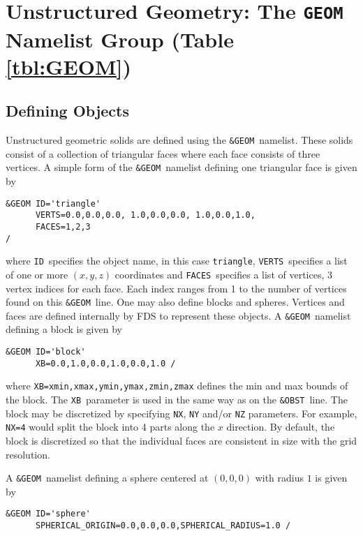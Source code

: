 \documentclass[12pt]{article}
\begin{document}
\vspace{1.0in}
\section{Unstructured Geometry: The \texorpdfstring{{\tt GEOM}}{GEOM} Namelist Group (Table \ref{tbl:GEOM})}
\label{info:GEOM}
\subsection{Defining Objects}

Unstructured geometric solids are defined using the {\tt \&GEOM}\ namelist.
These solids consist of a collection of triangular faces where each face consists of three vertices.
A simple form of the {\tt \&GEOM}\ namelist defining one triangular face is given by

\begin{verbatim}
&GEOM ID='triangle'
      VERTS=0.0,0.0,0.0, 1.0,0.0,0.0, 1.0,0.0,1.0,
      FACES=1,2,3
/
\end{verbatim}

\noindent where {\tt ID}\ specifies the object name, in this case {\tt triangle},
{\tt VERTS}\ specifies a list of one or more $(x,y,z)$ coordinates and {\tt FACES}\ specifies a list of vertices, 3 vertex indices for each
face. Each index ranges from 1 to the number of vertices found on this {\tt \&GEOM}\ line.  
One may also define blocks and spheres.  Vertices and faces are defined internally by FDS to represent these objects.  
A {\tt \&GEOM}\ namelist defining a block is given by

\begin{verbatim}
&GEOM ID='block'
      XB=0.0,1.0,0.0,1.0,0.0,1.0 /
\end{verbatim}

\noindent where {\tt XB=xmin,xmax,ymin,ymax,zmin,zmax} defines the min and max bounds of the block.  
The {\tt XB}\ parameter is used in the same way as on the {\tt \&OBST}\ line.  The block may be discretized by
specifying {\tt NX}, {\tt NY} and/or {\tt NZ} parameters.  For example, {\tt NX=4} would split the block 
into 4 parts along the $x$ direction. By default, the block is discretized
so that the individual faces are consistent in size with the grid resolution.


A {\tt \&GEOM}\ namelist defining a sphere centered at $(0,0,0)$ with radius $1$ is given by

\begin{verbatim}
&GEOM ID='sphere'
      SPHERICAL_ORIGIN=0.0,0.0,0.0,SPHERICAL_RADIUS=1.0 /
\end{verbatim}
\end{document}
